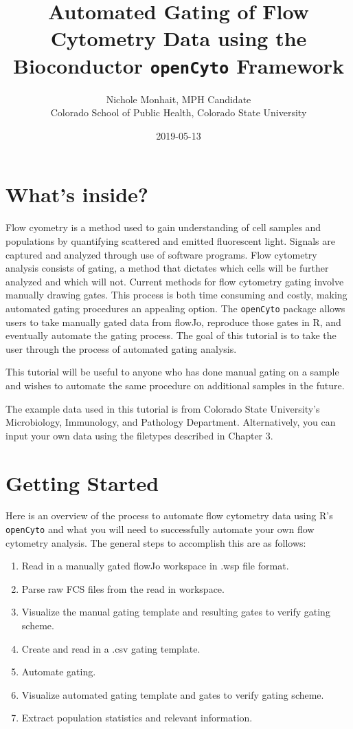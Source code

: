 \documentclass[]{book}
\title{Automated Gating of Flow Cytometry Data using the Bioconductor \texttt{openCyto} Framework}
\author{Nichole Monhait, MPH Candidate \\ Colorado School of Public Health, Colorado State University}
\date{2019-05-13}
\providecommand{\tightlist}{%
  \setlength{\itemsep}{0pt}\setlength{\parskip}{0pt}}
\begin{document}
\maketitle

{
\setcounter{tocdepth}{1}
\tableofcontents
}
\hypertarget{whats-inside}{%
\chapter{What's inside?}\label{whats-inside}}

Flow cyometry is a method used to gain understanding of cell samples and populations by quantifying scattered and emitted fluorescent light. Signals are captured and analyzed through use of software programs. Flow cytometry analysis consists of gating, a method that dictates which cells will be further analyzed and which will not. Current methods for flow cytometry gating involve manually drawing gates. This process is both time consuming and costly, making automated gating procedures an appealing option. The \texttt{openCyto} package allows users to take manually gated data from flowJo, reproduce those gates in R, and eventually automate the gating process. The goal of this tutorial is to take the user through the process of automated gating analysis.

This tutorial will be useful to anyone who has done manual gating on a sample and wishes to automate the same procedure on additional samples in the future.

The example data used in this tutorial is from Colorado State University's Microbiology, Immunology, and Pathology Department. Alternatively, you can input your own data using the filetypes described in Chapter 3.

\hypertarget{getting-started}{%
\chapter{Getting Started}\label{getting-started}}

Here is an overview of the process to automate flow cytometry data using R's \texttt{openCyto} and what you will need to successfully automate your own flow cytometry analysis. The general steps to accomplish this are as follows:

\begin{enumerate}
\def\labelenumi{\arabic{enumi}.}
\tightlist
\item
  Read in a manually gated flowJo workspace in .wsp file format.
\item
  Parse raw FCS files from the read in workspace.
\item
  Visualize the manual gating template and resulting gates to verify gating scheme.
\item
  Create and read in a .csv gating template.
\item
  Automate gating.
\item
  Visualize automated gating template and gates to verify gating scheme.
\item
  Extract population statistics and relevant information.
\end{enumerate}
\end{document}
